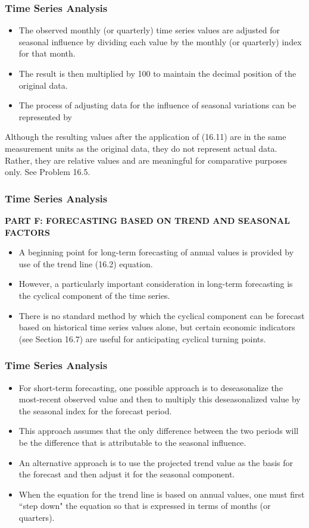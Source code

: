 \begin{frame}
\frametitle{Time Series Analysis}
\begin{itemize}
\item The observed monthly (or quarterly) time series values are adjusted for seasonal influence by dividing each
value by the monthly (or quarterly) index for that month. 
\item The result is then multiplied by 100 to maintain the
decimal position of the original data.
\item The process of adjusting data for the influence of seasonal variations can
be represented by
\end{itemize}

Although the resulting values after the application of (16.11) are in the same measurement units as the
original data, they do not represent actual data. Rather, they are relative values and are meaningful for
comparative purposes only. See Problem 16.5.

\end{frame}
\begin{frame}
\frametitle{Time Series Analysis}
\textbf{PART F: FORECASTING BASED ON TREND AND SEASONAL FACTORS}
\begin{itemize}
\item A beginning point for long-term forecasting of annual values is provided by use of the trend line (16.2)
equation. 
\item However, a particularly important consideration in long-term forecasting is the cyclical component of
the time series. 
\item There is no standard method by which the cyclical component can be forecast based on
historical time series values alone, but certain economic indicators (see Section 16.7) are useful for anticipating
cyclical turning points.
\end{itemize}

\end{frame}
\begin{frame}
\frametitle{Time Series Analysis}
\begin{itemize}
\item For short-term forecasting, one possible approach is to deseasonalize the most-recent observed value and
then to multiply this deseasonalized value by the seasonal index for the forecast period. 
\item This approach assumes
that the only difference between the two periods will be the difference that is attributable to the seasonal
influence. 
\item An alternative approach is to use the projected trend value as the basis for the forecast and then adjust
it for the seasonal component. 
\item When the equation for the trend line is based on annual values, one must first
``step down" the equation so that is expressed in terms of months (or quarters). 
\end{itemize}
\end{frame}

